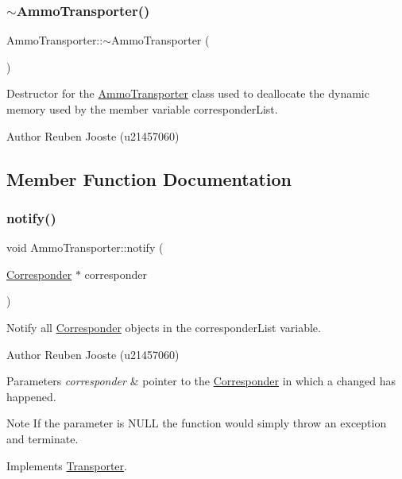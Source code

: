 \subsubsection{\texorpdfstring{$\sim$AmmoTransporter()}{~AmmoTransporter()}}
{\footnotesize\ttfamily Ammo\+Transporter\+::$\sim$\+Ammo\+Transporter (\begin{DoxyParamCaption}{ }\end{DoxyParamCaption})\hspace{0.3cm}{\ttfamily [virtual]}}



Destructor for the \mbox{\hyperlink{class_ammo_transporter}{Ammo\+Transporter}} class used to deallocate the dynamic memory used by the member variable corresponder\+List. 

\begin{DoxyAuthor}{Author}
Reuben Jooste (u21457060) 
\end{DoxyAuthor}


\subsection{Member Function Documentation}
\mbox{\label{class_ammo_transporter_a2f29d78a7be5b6116b7299494fef2b7e}} 
\subsubsection{\texorpdfstring{notify()}{notify()}}
{\footnotesize\ttfamily void Ammo\+Transporter\+::notify (\begin{DoxyParamCaption}\item[{\mbox{\hyperlink{class_corresponder}{Corresponder}} $\ast$}]{corresponder }\end{DoxyParamCaption})\hspace{0.3cm}{\ttfamily [virtual]}}



Notify all \mbox{\hyperlink{class_corresponder}{Corresponder}} objects in the corresponder\+List variable. 

\begin{DoxyAuthor}{Author}
Reuben Jooste (u21457060) 
\end{DoxyAuthor}

\begin{DoxyParams}{Parameters}
{\em corresponder} & pointer to the \mbox{\hyperlink{class_corresponder}{Corresponder}} in which a changed has happened. \\
\hline
\end{DoxyParams}
\begin{DoxyNote}{Note}
If the parameter is N\+U\+LL the function would simply throw an exception and terminate. 
\end{DoxyNote}


Implements \mbox{\hyperlink{class_transporter_aadf5e8b8dabe203e8b184ae00847c249}{Transporter}}.

